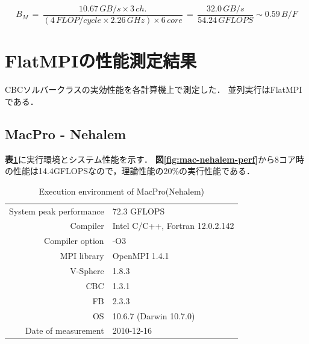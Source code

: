 \begin{equation}
B_M \,=\, \frac{10.67\,GB/s \times 3\,ch.}{(4\,FLOP/cycle \times 2.26\,GHz) \times 6\,core} \,=\, \frac{32.0\,GB/s}{54.24\,GFLOPS} \sim 0.59\,B/F
\label{eq:B_M focus}
\end{equation}

%

\pagebreak

\section{FlatMPIの性能測定結果}
CBCソルバークラスの実効性能を各計算機上で測定した．
並列実行はFlatMPIである．

%
\subsection{MacPro - Nehalem}
\textbf{表\ref{tbl:macpro-env-nehalem}}に実行環境とシステム性能を示す．
\textbf{図\ref{fig:mac-nehalem-perf}}から8コア時の性能は14.4GFLOPSなので，理論性能の20\%の実行性能である．

\begin{table}[htdp]
\caption{Execution environment of MacPro(Nehalem)}
\small
\begin{center}
\begin{tabular}{rl}\toprule
System peak performance & 72.3 GFLOPS\\
Compiler & Intel C/C++, Fortran 12.0.2.142\\
Compiler option & -O3\\
MPI library & OpenMPI 1.4.1\\
V-Sphere & 1.8.3\\
CBC & 1.3.1\\
FB & 2.3.3\\
OS & 10.6.7 (Darwin 10.7.0)\\
Date of measurement & 2010-12-16\\ \bottomrule
\end{tabular}
\end{center}
\label{tbl:macpro-env-nehalem}
\end{table}

